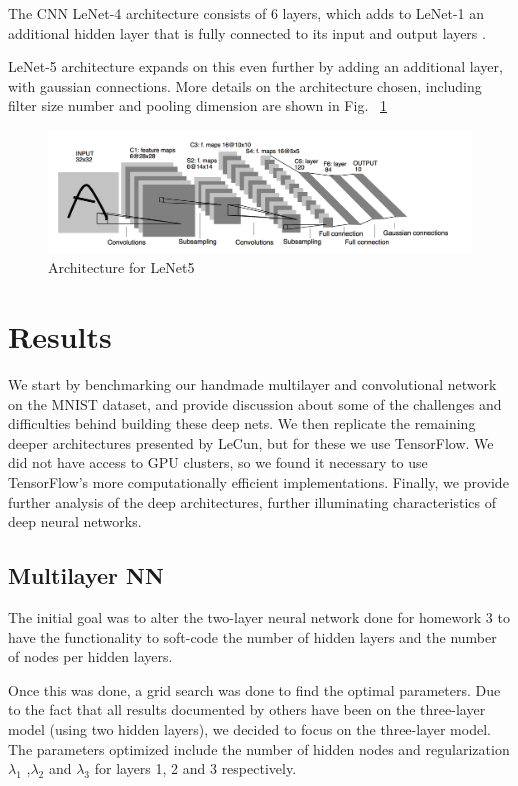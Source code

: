 \documentclass[12pt, twocolumn]{article}
\begin{document}
The CNN LeNet-4 architecture consists of 6 layers, which adds to LeNet-1 an additional hidden layer that is fully connected to its  input and output layers  \cite{LeCun95}.

LeNet-5 architecture expands on this even further by adding an additional layer, with gaussian connections. More details on the architecture chosen, including filter size number and pooling dimension are shown in Fig. ~\ref{fig:LeNet5}

 \begin{figure}
\includegraphics[scale=.6]{LeNet5.png}
\caption{Architecture for LeNet5 \cite{LeCun1998}}
\label{fig:LeNet5}
\end{figure}



\section{Results}
We start by benchmarking our handmade multilayer and convolutional network on the MNIST dataset, and provide discussion about some of the challenges and difficulties behind building these deep nets. We then replicate the remaining deeper architectures presented by LeCun, but for these we use TensorFlow. We did not have access to GPU clusters, so we found it necessary to use TensorFlow's more computationally efficient implementations. Finally, we provide further analysis of the deep architectures, further illuminating characteristics of deep neural networks. 

\subsection{Multilayer NN}
The initial goal was to alter the two-layer neural network done for homework 3 to have the functionality to soft-code the number of hidden layers and the number of nodes per hidden layers.

Once this was done, a grid search was done to find the optimal parameters. Due to the fact that all results documented by others have been on the three-layer model (using two hidden layers), we decided to focus on the three-layer model. The parameters optimized include the number of hidden nodes and regularization $\lambda_1$ ,$\lambda_2$ and $\lambda_3$ for layers 1, 2 and 3 respectively.
\end{document}
